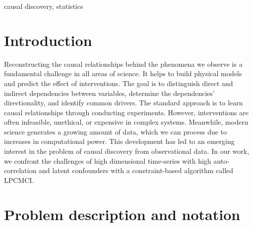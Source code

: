 \documentclass[conference]{IEEEtran}
\begin{document}
\begin{IEEEkeywords}
causal discovery, statistics
\end{IEEEkeywords}

\section{Introduction}
Reconstructing the causal relationships behind the phenomena we observe is a fundamental challenge in all areas of science. It helps to build physical models and predict the effect of interventions\cite{pearl_book_2018}.
The goal is to distinguish direct and indirect dependencies between variables, determine the dependencies' directionality, and identify common drivers.
The standard approach is to learn causal relationships through conducting experiments. However, interventions are often infeasible, unethical, or expensive in complex systems\cite{runge_inferring_2019}. 
Meanwhile, modern science generates a growing amount of data, which we can process due to increases in computational power.
This development has led to an emerging interest in the problem of causal discovery from observational data\cite{peters_elements_2018}.
In our work, we confront the challenges of high dimensional time-series with high auto-correlation and latent confounders with a constraint-based algorithm called LPCMCI\cite{gerhardus_high-recall_2021}.
\section{Problem description and notation}
\end{document}
